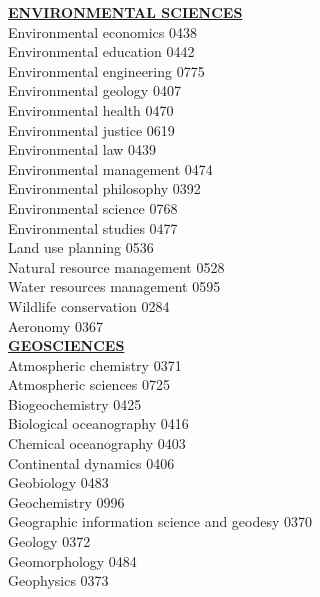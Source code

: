 \documentclass[9pt,twoside]{article}
\newcommand{\categoryheading}[1]{{\fontsize{8}{11}\selectfont \textbf{\uline{#1}}}}
\begin{document}
\begin{multicols}{3}
\categoryheading{ENVIRONMENTAL SCIENCES} \leavevmode \\
Environmental economics \hfill 0438 \leavevmode \\
Environmental education \hfill 0442 \leavevmode \\
Environmental engineering \hfill 0775 \leavevmode \\
Environmental geology \hfill 0407 \leavevmode \\
Environmental health \hfill 0470 \leavevmode \\
Environmental justice \hfill 0619 \leavevmode \\
Environmental law \hfill 0439 \leavevmode \\
Environmental management \hfill 0474 \leavevmode \\
Environmental philosophy \hfill 0392 \leavevmode \\
Environmental science \hfill 0768 \leavevmode \\
Environmental studies \hfill 0477 \leavevmode \\
Land use planning \hfill 0536 \leavevmode \\
Natural resource management \hfill 0528 \leavevmode \\
Water resources management \hfill 0595 \leavevmode \\
Wildlife conservation \hfill 0284 \leavevmode \\
Aeronomy \hfill 0367 \leavevmode \\
\columnbreak
\categoryheading{GEOSCIENCES} \leavevmode \\
Atmospheric chemistry \hfill 0371 \leavevmode \\
Atmospheric sciences \hfill 0725 \leavevmode \\
Biogeochemistry \hfill 0425 \leavevmode \\
Biological oceanography \hfill 0416 \leavevmode \\
Chemical oceanography \hfill 0403 \leavevmode \\
Continental dynamics \hfill 0406 \leavevmode \\
Geobiology \hfill 0483 \leavevmode \\
Geochemistry \hfill 0996 \leavevmode \\
Geographic information science
and geodesy \hfill 0370 \leavevmode \\
Geology \hfill 0372 \leavevmode \\
Geomorphology \hfill 0484 \leavevmode \\
Geophysics \hfill 0373 \leavevmode \\

\end{multicols}
\end{document}
